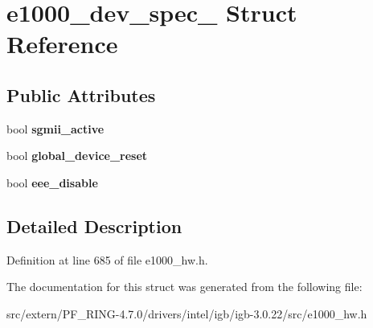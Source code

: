 \hypertarget{structe1000__dev__spec__82575}{
\section{e1000\_\-dev\_\-spec\_ Struct Reference}
\label{structe1000__dev__spec__82575}
}
\subsection*{Public Attributes}
\begin{DoxyCompactItemize}
\item 
\hypertarget{structe1000__dev__spec__82575_a589fceb753e63934c0ee2ebd472620d9}{
bool {\bfseries sgmii\_\-active}}
\label{structe1000__dev__spec__82575_a589fceb753e63934c0ee2ebd472620d9}

\item 
\hypertarget{structe1000__dev__spec__82575_ad24beaf75a218387bc5c698a07e15b93}{
bool {\bfseries global\_\-device\_\-reset}}
\label{structe1000__dev__spec__82575_ad24beaf75a218387bc5c698a07e15b93}

\item 
\hypertarget{structe1000__dev__spec__82575_a2442bba3e7dae375464292fbc3bba6aa}{
bool {\bfseries eee\_\-disable}}
\label{structe1000__dev__spec__82575_a2442bba3e7dae375464292fbc3bba6aa}

\end{DoxyCompactItemize}


\subsection{Detailed Description}


Definition at line 685 of file e1000\_\-hw.h.



The documentation for this struct was generated from the following file:\begin{DoxyCompactItemize}
\item 
src/extern/PF\_\-RING-\/4.7.0/drivers/intel/igb/igb-\/3.0.22/src/e1000\_\-hw.h\end{DoxyCompactItemize}
